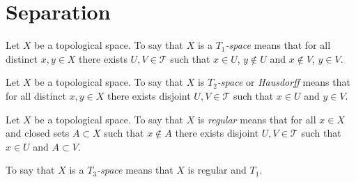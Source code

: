 \documentclass[letterpaper,12pt,fleqn]{article}
\newcommand{\T}{\mathscr{T}}
\begin{document}
\section*{Separation}

\begin{definition}[\(T_1\)]
  Let \(X\) be a topological space.  To say that \(X\) is a \(T_1\)\emph{-space} means that for all distinct
  \(x,y\in X\) there exists \(U,V\in\T\) such that \(x\in U\), \(y\notin U\) and \(x\notin V\), \(y\in V\).
  \begin{center}
  \end{center}
\end{definition}

\begin{definition}[\(T_2\)]
  Let \(X\) be a topological space.  To say that \(X\) is \(T_2\)\emph{-space} or \emph{Hausdorff} means that for
  all distinct \(x,y\in X\) there exists disjoint \(U,V\in\T\) such that \(x\in U\) and \(y\in V\).
  \begin{center}
  \end{center}
\end{definition}

\begin{definition}[Regular]
  Let \(X\) be a topological space.  To say that \(X\) is \emph{regular} means that for all \(x\in X\) and closed
  sets \(A\subset X\) such that \(x\notin A\) there exists disjoint \(U,V\in\T\) such that \(x\in U\) and
  \(A\subset V\).
  \begin{center}
  \end{center}
  To say that \(X\) is a \(T_3\)\emph{-space} means that \(X\) is regular and \(T_1\).
\end{definition}
\end{document}
